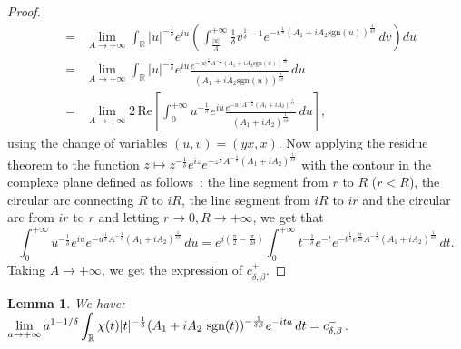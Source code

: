 \documentclass[oneside, a4paper,11pt,reqno]{amsart}
\newtheorem{lem}[hypo]{Lemma}
\begin{document}
\begin{proof}
\begin{eqnarray*}
&=& \lim_{A\rightarrow +\infty} \int_{\mathbb R}|u|^{-\frac 1\delta}e^{iu}\left(
 \int_{\frac {|u|}A}^{+\infty} \frac{1}{\delta}v^{\frac 1\delta-1} 
   e^{-v^{\frac{1}{\delta}} (A_1+iA_2\text{sgn}(u))^{\frac{1}{\delta\beta}}} \, dv \right) du \\
&=& \lim_{A\rightarrow +\infty} \int_{\mathbb R}|u|^{-\frac 1\delta}e^{iu}
\frac{e^{-|u|^{\frac{1}{\delta}} A^{-\frac 1\delta}(A_1+iA_2\text{sgn}
(u))^{\frac{1}{\delta\beta}}}}{(A_1+iA_2\textrm{sgn}(u))^{\frac 1{\delta\beta}}}\, du\\
&=&\lim_{A\rightarrow +\infty} 2 \, \textrm{Re}\left[ 
\int_0^{+\infty}u^{-\frac 1\delta}e^{iu}
\frac{e^{-u^{\frac{1}{\delta}} A^{-\frac 1\delta}(A_1+iA_2
)^{\frac{1}{\delta\beta}}}}{(A_1+iA_2)^{\frac 1{\delta\beta}}}\, du\right],
\end{eqnarray*}
using the change of variables $(u,v)=(yx,x)$.
Now applying the residue theorem to the function $z\mapsto z^{-\frac 1\delta} 
e^{iz} e^{-z^{\frac 1\delta}A^{-\frac 1\delta} (A_1+iA_2)^{\frac{1}{\delta\beta}}}$ with the contour in the complexe plane defined as follows~: 
the line segment from  $r$ to $R$ ($r<R$), the circular arc connecting $R$ to $iR$, 
the line segment from $iR$ to $ir$ and the circular arc from $ir$ to $r$ and letting 
$r\rightarrow 0, R\rightarrow +\infty$, we get that 
$$
\int_0^{+\infty}u^{-\frac 1\delta}e^{iu}
{e^{-u^{\frac{1}{\delta}} A^{-\frac 1\delta}(A_1+iA_2)^{\frac{1}{\delta\beta}}}}\, du
= e^{i\left(\frac \pi 2-\frac \pi{2\delta}\right)}
  \int_0^{+\infty}t^{-\frac 1\delta}e^{-t}
{e^{-t^{\frac{1}{\delta}}e^{\frac {i\pi}{2\delta}} A^{-\frac 1\delta}(A_1+iA_2)^{\frac{1}{\delta\beta}}}}\, dt.
$$
Taking $A\rightarrow +\infty$, we get the expression of $c_{\delta,\beta}^+$.
\end{proof}
\begin{lem} \label{id-approche}
We have: $\displaystyle \lim_{a\rightarrow +\infty}a^{1-1/\delta} 
\int_{\mathbb R}\chi(t) |t|^{-\frac 1\delta} (A_1+iA_2\ \text{\rm sgn}(t))^{-\frac1{\delta\beta}} e^{-i ta}
  \, dt = c_{\delta,\beta}^-$. 
\end{lem}
\end{document}
